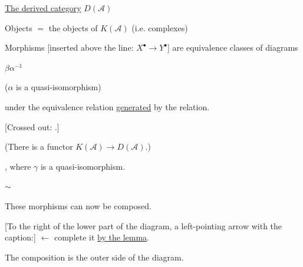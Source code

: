 \underline{The derived category} $D(\mathcal A)$

Objects $=$ the objects of $K(\mathcal A)$ (i.e. complexes)

Morphisms [inserted above the line: $X^\bullet\longrightarrow Y^\bullet$] are equivalence classes of diagrams
\begin{center}
\qquad $\beta\alpha^{-1}$
\end{center}
($\alpha$ is a quasi-isomorphism)

under the equivalence relation \underline{generated}
by the  relation.

[Crossed out: .]

(There is a functor $K(\mathcal A)\longrightarrow D(\mathcal A)$.)

\begin{center}
\end{center}

,
where $\gamma$ is a quasi-isomorphism.

\begin{center}
\quad $\sim$ \quad
{}
\end{center}

These morphisms can now be composed.

\begin{center}
\end{center}
[To the right of the lower part of the diagram, a left-pointing arrow with the caption:]
$\longleftarrow$ complete it \underline{by the lemma}.

The composition is the outer side of the diagram.

